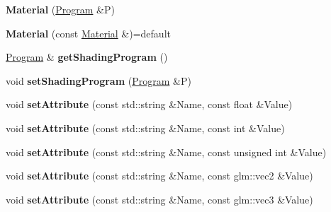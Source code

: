 \begin{DoxyCompactItemize}
\item 
\hypertarget{class_material_a76819b8614c4184100af15ffcff511e8}{{\bfseries Material} (\hyperlink{class_program}{Program} \&P)}\label{class_material_a76819b8614c4184100af15ffcff511e8}

\item 
\hypertarget{class_material_a7ea61c71ac05b6df27fafa0ce2680341}{{\bfseries Material} (const \hyperlink{class_material}{Material} \&)=default}\label{class_material_a7ea61c71ac05b6df27fafa0ce2680341}

\item 
\hypertarget{class_material_ad097cc67cb4267568970a000adee3fcd}{\hyperlink{class_program}{Program} \& {\bfseries get\+Shading\+Program} ()}\label{class_material_ad097cc67cb4267568970a000adee3fcd}

\item 
\hypertarget{class_material_ae6b292382c0472f9a7317234dd7ec745}{void {\bfseries set\+Shading\+Program} (\hyperlink{class_program}{Program} \&P)}\label{class_material_ae6b292382c0472f9a7317234dd7ec745}

\item 
\hypertarget{class_material_a345766d313ba71edd8d20a3e44f41e0d}{void {\bfseries set\+Attribute} (const std\+::string \&Name, const float \&Value)}\label{class_material_a345766d313ba71edd8d20a3e44f41e0d}

\item 
\hypertarget{class_material_a64ef9d86ee8a2935a2c37ced96605b35}{void {\bfseries set\+Attribute} (const std\+::string \&Name, const int \&Value)}\label{class_material_a64ef9d86ee8a2935a2c37ced96605b35}

\item 
\hypertarget{class_material_a2efa2332318db2e2330bb30661d30fa2}{void {\bfseries set\+Attribute} (const std\+::string \&Name, const unsigned int \&Value)}\label{class_material_a2efa2332318db2e2330bb30661d30fa2}

\item 
\hypertarget{class_material_ab3c06a1202667f57b28212dd2d9d36dd}{void {\bfseries set\+Attribute} (const std\+::string \&Name, const glm\+::vec2 \&Value)}\label{class_material_ab3c06a1202667f57b28212dd2d9d36dd}

\item 
\hypertarget{class_material_a0f32aedf8001cf133879010b64f3fccd}{void {\bfseries set\+Attribute} (const std\+::string \&Name, const glm\+::vec3 \&Value)}\label{class_material_a0f32aedf8001cf133879010b64f3fccd}


\end{DoxyCompactItemize}
